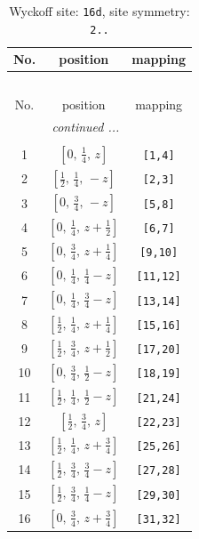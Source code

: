 \documentclass[fleqn,8pt]{jsarticle}
\begin{document}
\renewcommand{\arraystretch}{1.2}
\begin{longtable}{ccc}
\caption{Wyckoff site: {\tt 16d}, site symmetry: {\tt 2..}}
 \\
 \hline \hline
No. & position & mapping \\ \hline \endfirsthead

\multicolumn{2}{l}{\tablename\ \thetable{}} \\
 \hline \hline
No. & position & mapping \\ \hline \endhead

 \hline \hline
\multicolumn{2}{r}{\footnotesize\it continued ...} \\ \endfoot

 \hline \hline
\multicolumn{2}{r}{} \\ \endlastfoot

1 & $\left[ 0,\, \frac{1}{4},\, z \right]$ & {\tt [1,4]} \\ \hline
2 & $\left[ \frac{1}{2},\, \frac{1}{4},\, - z \right]$ & {\tt [2,3]} \\ \hline
3 & $\left[ 0,\, \frac{3}{4},\, - z \right]$ & {\tt [5,8]} \\ \hline
4 & $\left[ 0,\, \frac{1}{4},\, z + \frac{1}{2} \right]$ & {\tt [6,7]} \\ \hline
5 & $\left[ 0,\, \frac{3}{4},\, z + \frac{1}{4} \right]$ & {\tt [9,10]} \\ \hline
6 & $\left[ 0,\, \frac{1}{4},\, \frac{1}{4} - z \right]$ & {\tt [11,12]} \\ \hline
7 & $\left[ 0,\, \frac{1}{4},\, \frac{3}{4} - z \right]$ & {\tt [13,14]} \\ \hline
8 & $\left[ \frac{1}{2},\, \frac{1}{4},\, z + \frac{1}{4} \right]$ & {\tt [15,16]} \\ \hline
9 & $\left[ \frac{1}{2},\, \frac{3}{4},\, z + \frac{1}{2} \right]$ & {\tt [17,20]} \\ \hline
10 & $\left[ 0,\, \frac{3}{4},\, \frac{1}{2} - z \right]$ & {\tt [18,19]} \\ \hline
11 & $\left[ \frac{1}{2},\, \frac{1}{4},\, \frac{1}{2} - z \right]$ & {\tt [21,24]} \\ \hline
12 & $\left[ \frac{1}{2},\, \frac{3}{4},\, z \right]$ & {\tt [22,23]} \\ \hline
13 & $\left[ \frac{1}{2},\, \frac{1}{4},\, z + \frac{3}{4} \right]$ & {\tt [25,26]} \\ \hline
14 & $\left[ \frac{1}{2},\, \frac{3}{4},\, \frac{3}{4} - z \right]$ & {\tt [27,28]} \\ \hline
15 & $\left[ \frac{1}{2},\, \frac{3}{4},\, \frac{1}{4} - z \right]$ & {\tt [29,30]} \\ \hline
16 & $\left[ 0,\, \frac{3}{4},\, z + \frac{3}{4} \right]$ & {\tt [31,32]} \\
\end{longtable}
\end{document}
